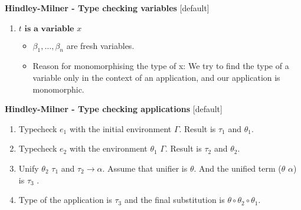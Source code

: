 \documentclass{beamer}
\begin{document}
\begin{frame}[fragile]{\textbf{Hindley-Milner - Type checking variables}}
[default]
\begin{enumerate}[1:]
\item $t \textbf{ is a variable } x$
\begin{figure}[h]
\end{figure}
\begin{itemize}
  \item $\beta_{1},\ldots,\beta_{n}$ are fresh variables.
  \item Reason for monomorphising the type of x: We try to find the type of
  a variable only in the context of an application, and our application
  is monomorphic.
\end{itemize}
\end{enumerate}
\end{frame}


\begin{frame}[fragile]{\textbf{Hindley-Milner - Type checking applications}}
[default]
\begin{enumerate}[1]
    \item Typecheck $e_1$ with the initial environment $\Gamma$. Result is $\tau_1$ and $\theta_1$.
    \item Typecheck $e_2$ with the environment $\theta_1$ $\Gamma$. Result is $\tau_2$ and $\theta_2$.
    \item Unify $\theta_2$ $\tau_1$ and $\tau_2 \to \alpha$. Assume that unifier is $\theta$. And the unified
term ($\theta$ $\alpha$) is $\tau_3$ .
    \item Type of the application is $\tau_3$ and the final substitution is $\theta\circ\theta_2\circ\theta_1$.
\end{enumerate}
\end{frame}
\end{document}
